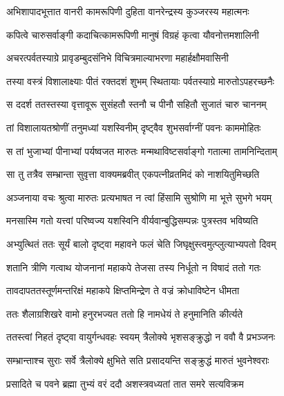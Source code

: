 \twolineshloka
{अभिशापादभूत्तात वानरी कामरूपिणी}
{दुहिता वानरेन्द्रस्य कुञ्जरस्य महात्मनः} %

\twolineshloka
{कपित्वे चारुसर्वाङ्गी कदाचित्कामरूपिणी}
{मानुषं विग्रहं कृत्वा यौवनोत्तमशालिनी} %

\twolineshloka
{अचरत्पर्वतस्याग्रे प्रावृडम्बुदसंनिभे}
{विचित्रमाल्याभरणा महार्हक्षौमवासिनी} %

\twolineshloka
{तस्या वस्त्रं विशालाक्ष्याः पीतं रक्तदशं शुभम्}
{स्थितायाः पर्वतस्याग्रे मारुतोऽपहरच्छनैः} %

\twolineshloka
{स ददर्श ततस्तस्या वृत्तावूरू सुसंहतौ}
{स्तनौ च पीनौ सहितौ सुजातं चारु चाननम्} %

\twolineshloka
{तां विशालायतश्रोणीं तनुमध्यां यशस्विनीम्}
{दृष्ट्वैव शुभसर्वाग्नीं पवनः काममोहितः} %

\twolineshloka
{स तां भुजाभ्यां पीनाभ्यां पर्यष्वजत मारुतः}
{मन्मथाविष्टसर्वाङ्गो गतात्मा तामनिन्दिताम्} %

\twolineshloka
{सा तु तत्रैव सम्भ्रान्ता सुवृत्ता वाक्यमब्रवीत्}
{एकपत्नीव्रतमिदं को नाशयितुमिच्छति} %

\twolineshloka
{अञ्जनाया वचः श्रुत्वा मारुतः प्रत्यभाषत}
{न त्वां हिंसामि सुश्रोणि मा भूत्ते सुभगे भयम्} %

\twolineshloka
{मनसास्मि गतो यत्त्वां परिष्वज्य यशस्विनि}
{वीर्यवान्बुद्धिसम्पन्नः पुत्रस्तव भविष्यति} %

\twolineshloka
{अभ्युत्थितं ततः सूर्यं बालो दृष्ट्वा महावने}
{फलं चेति जिघृक्षुस्त्वमुत्प्लुत्याभ्यपतो दिवम्} %

\twolineshloka
{शतानि त्रीणि गत्वाथ योजनानां महाकपे}
{तेजसा तस्य निर्धूतो न विषादं ततो गतः} %

\twolineshloka
{तावदापततस्तूर्णमन्तरिक्षं महाकपे}
{क्षिप्तमिन्द्रेण ते वज्रं क्रोधाविष्टेन धीमता} %

\twolineshloka
{ततः शैलाग्रशिखरे वामो हनुरभज्यत}
{ततो हि नामधेयं ते हनुमानिति कीर्त्यते} %

\twolineshloka
{ततस्त्वां निहतं दृष्ट्वा वायुर्गन्धवहः स्वयम्}
{त्रैलोक्ये भृशसङ्क्रुद्धो न ववौ वै प्रभञ्जनः} %

\twolineshloka
{सम्भ्रान्ताश्च सुराः सर्वे त्रैलोक्ये क्षुभिते सति}
{प्रसादयन्ति सङ्क्रुद्धं मारुतं भुवनेश्वराः} %

\twolineshloka
{प्रसादिते च पवने ब्रह्मा तुभ्यं वरं ददौ}
{अशस्त्रवध्यतां तात समरे सत्यविक्रम} %


